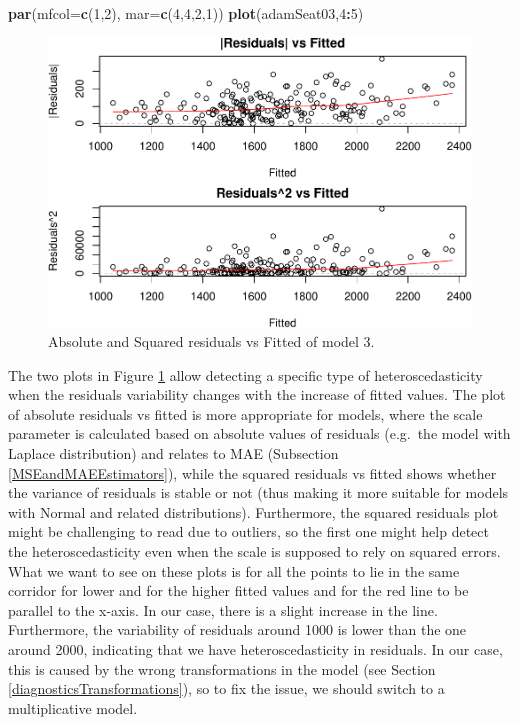 \documentclass[]{book}
\newenvironment{Shaded}{\begin{snugshade}}{\end{snugshade}}
\newcommand{\DataTypeTok}[1]{\textcolor[rgb]{0.13,0.29,0.53}{#1}}
\newcommand{\DecValTok}[1]{\textcolor[rgb]{0.00,0.00,0.81}{#1}}
\newcommand{\KeywordTok}[1]{\textcolor[rgb]{0.13,0.29,0.53}{\textbf{#1}}}
\newcommand{\NormalTok}[1]{#1}
\newcommand{\OperatorTok}[1]{\textcolor[rgb]{0.81,0.36,0.00}{\textbf{#1}}}
\theoremstyle{definition}
\theoremstyle{definition}
\theoremstyle{definition}
\theoremstyle{definition}
\theoremstyle{remark}
\begin{document}
\begin{Shaded}
\begin{Highlighting}[]
\KeywordTok{par}\NormalTok{(}\DataTypeTok{mfcol=}\KeywordTok{c}\NormalTok{(}\DecValTok{1}\NormalTok{,}\DecValTok{2}\NormalTok{), }\DataTypeTok{mar=}\KeywordTok{c}\NormalTok{(}\DecValTok{4}\NormalTok{,}\DecValTok{4}\NormalTok{,}\DecValTok{2}\NormalTok{,}\DecValTok{1}\NormalTok{))}
\KeywordTok{plot}\NormalTok{(adamSeat03,}\DecValTok{4}\OperatorTok{:}\DecValTok{5}\NormalTok{)}
\end{Highlighting}
\end{Shaded}

\begin{figure}
\centering
\includegraphics{Svetunkov--2022----ADAM_files/figure-latex/adamSeat03Hetero-1.pdf}
\caption{\label{fig:adamSeat03Hetero}Absolute and Squared residuals vs Fitted of model 3.}
\end{figure}

The two plots in Figure \ref{fig:adamSeat03Hetero} allow detecting a specific type of heteroscedasticity when the residuals variability changes with the increase of fitted values. The plot of absolute residuals vs fitted is more appropriate for models, where the scale parameter is calculated based on absolute values of residuals (e.g.~the model with Laplace distribution) and relates to MAE (Subsection \ref{MSEandMAEEstimators}), while the squared residuals vs fitted shows whether the variance of residuals is stable or not (thus making it more suitable for models with Normal and related distributions). Furthermore, the squared residuals plot might be challenging to read due to outliers, so the first one might help detect the heteroscedasticity even when the scale is supposed to rely on squared errors. What we want to see on these plots is for all the points to lie in the same corridor for lower and for the higher fitted values and for the red line to be parallel to the x-axis. In our case, there is a slight increase in the line. Furthermore, the variability of residuals around 1000 is lower than the one around 2000, indicating that we have heteroscedasticity in residuals. In our case, this is caused by the wrong transformations in the model (see Section \ref{diagnosticsTransformations}), so to fix the issue, we should switch to a multiplicative model.
\end{document}

